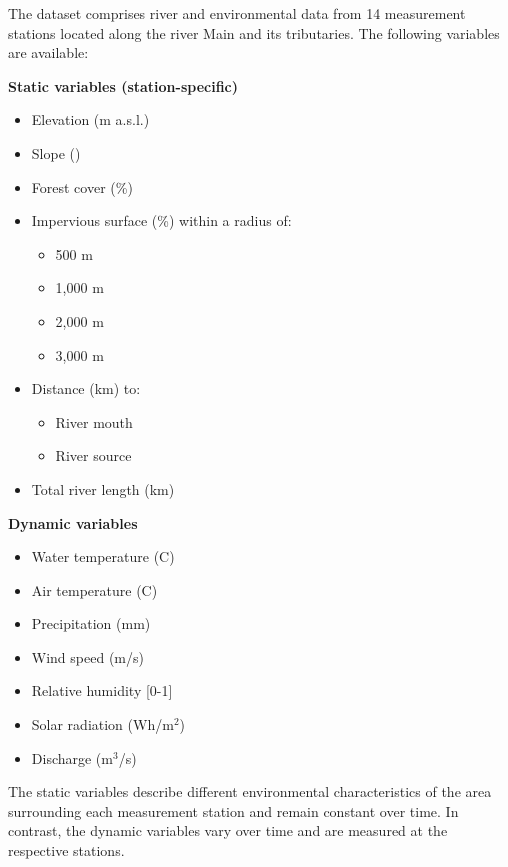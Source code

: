 \documentclass[
]{krantz}
\begin{document}
The dataset comprises river and environmental data from 14 measurement stations located along the river Main and its tributaries. The following variables are available:

\begin{minipage}[t]{0.48\textwidth}
\textbf{Static variables (station-specific)}
\begin{itemize}
  \item Elevation (m a.s.l.)
  \item Slope (\textdegree)
  \item Forest cover (\%)
  \item Impervious surface (\%) within a radius of:
  \begin{itemize}
    \item 500 m
    \item 1,000 m
    \item 2,000 m
    \item 3,000 m
  \end{itemize}
  \item Distance (km) to:
  \begin{itemize}
    \item River mouth
    \item River source
  \end{itemize}
  \item Total river length (km)
\end{itemize}
\end{minipage}
\hfill
\begin{minipage}[t]{0.48\textwidth}
\textbf{Dynamic variables}
\begin{itemize}
  \item Water temperature (\textdegree C)
  \item Air temperature (\textdegree C)
  \item Precipitation (mm)
  \item Wind speed (m/s)
  \item Relative humidity [0-1]
  \item Solar radiation (Wh/$\text{m}^2$)
  \item Discharge ($\text{m}^3$/s)
\end{itemize}
\end{minipage}

The static variables describe different environmental characteristics of the area surrounding each measurement station and remain constant over time. In contrast, the dynamic variables vary over time and are measured at the respective stations.
\end{document}
